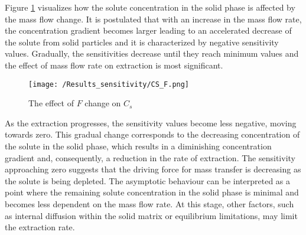 \documentclass[../Article_Sensitivity_Analsysis.tex]{subfiles}
\begin{document}
   Figure \ref{fig:Sensitivty_F_CS} visualizes how the solute concentration in the solid phase is affected by the mass flow change. It is postulated that with an increase in the mass flow rate, the concentration gradient becomes larger leading to an accelerated decrease of the solute from solid particles and it is characterized by negative sensitivity values. Gradually, the sensitivities decrease until they reach minimum values and the effect of mass flow rate on extraction is most significant.
   
   \begin{figure}[h!]
   	\centering
   	\texttt{[image: /Results\_sensitivity/CS\_F.png]}
   	\caption{The effect of $F$ change on $C_s$}
   	\label{fig:Sensitivty_F_CS}
   \end{figure}
   
   As the extraction progresses, the sensitivity values become less negative, moving towards zero. This gradual change corresponds to the decreasing concentration of the solute in the solid phase, which results in a diminishing concentration gradient and, consequently, a reduction in the rate of extraction. The sensitivity approaching zero suggests that the driving force for mass transfer is decreasing as the solute is being depleted. The asymptotic behaviour can be interpreted as a point where the remaining solute concentration in the solid phase is minimal and becomes less dependent on the mass flow rate. At this stage, other factors, such as internal diffusion within the solid matrix or equilibrium limitations, may limit the extraction rate.
   
   
   
\end{document}
